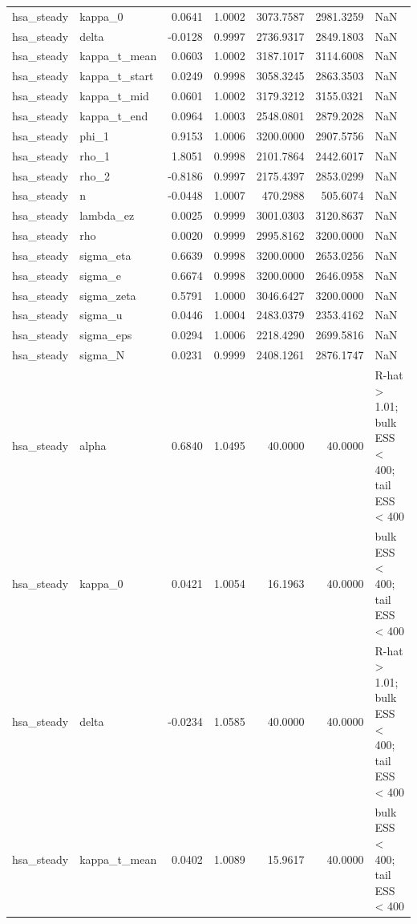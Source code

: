 \begin{tabular}{llrrrrl}
hsa\_steady & kappa\_0 & 0.0641 & 1.0002 & 3073.7587 & 2981.3259 & NaN \\
hsa\_steady & delta & -0.0128 & 0.9997 & 2736.9317 & 2849.1803 & NaN \\
hsa\_steady & kappa\_t\_mean & 0.0603 & 1.0002 & 3187.1017 & 3114.6008 & NaN \\
hsa\_steady & kappa\_t\_start & 0.0249 & 0.9998 & 3058.3245 & 2863.3503 & NaN \\
hsa\_steady & kappa\_t\_mid & 0.0601 & 1.0002 & 3179.3212 & 3155.0321 & NaN \\
hsa\_steady & kappa\_t\_end & 0.0964 & 1.0003 & 2548.0801 & 2879.2028 & NaN \\
hsa\_steady & phi\_1 & 0.9153 & 1.0006 & 3200.0000 & 2907.5756 & NaN \\
hsa\_steady & rho\_1 & 1.8051 & 0.9998 & 2101.7864 & 2442.6017 & NaN \\
hsa\_steady & rho\_2 & -0.8186 & 0.9997 & 2175.4397 & 2853.0299 & NaN \\
hsa\_steady & n & -0.0448 & 1.0007 & 470.2988 & 505.6074 & NaN \\
hsa\_steady & lambda\_ez & 0.0025 & 0.9999 & 3001.0303 & 3120.8637 & NaN \\
hsa\_steady & rho & 0.0020 & 0.9999 & 2995.8162 & 3200.0000 & NaN \\
hsa\_steady & sigma\_eta & 0.6639 & 0.9998 & 3200.0000 & 2653.0256 & NaN \\
hsa\_steady & sigma\_e & 0.6674 & 0.9998 & 3200.0000 & 2646.0958 & NaN \\
hsa\_steady & sigma\_zeta & 0.5791 & 1.0000 & 3046.6427 & 3200.0000 & NaN \\
hsa\_steady & sigma\_u & 0.0446 & 1.0004 & 2483.0379 & 2353.4162 & NaN \\
hsa\_steady & sigma\_eps & 0.0294 & 1.0006 & 2218.4290 & 2699.5816 & NaN \\
hsa\_steady & sigma\_N & 0.0231 & 0.9999 & 2408.1261 & 2876.1747 & NaN \\
hsa\_steady & alpha & 0.6840 & 1.0495 & 40.0000 & 40.0000 & R-hat > 1.01; bulk ESS < 400; tail ESS < 400 \\
hsa\_steady & kappa\_0 & 0.0421 & 1.0054 & 16.1963 & 40.0000 & bulk ESS < 400; tail ESS < 400 \\
hsa\_steady & delta & -0.0234 & 1.0585 & 40.0000 & 40.0000 & R-hat > 1.01; bulk ESS < 400; tail ESS < 400 \\
hsa\_steady & kappa\_t\_mean & 0.0402 & 1.0089 & 15.9617 & 40.0000 & bulk ESS < 400; tail ESS < 400 \\

\end{tabular}
